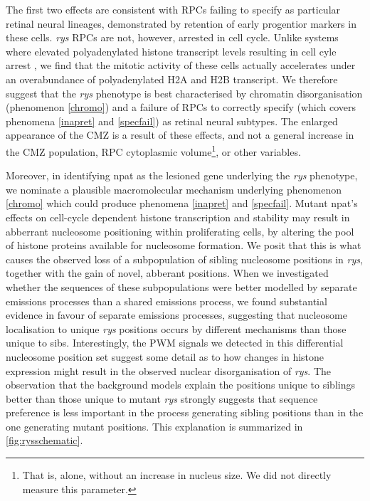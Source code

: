 The first two effects are consistent with RPCs failing to specify as particular retinal neural lineages, demonstrated by retention of early progentior markers in these cells. \textit{rys} RPCs are not, however, arrested in cell cycle. Unlike systems where elevated polyadenylated histone transcript levels resulting in cell cyle arrest \cite{Kari2013}, we find that the mitotic activity of these cells actually accelerates under an overabundance of polyadenylated H2A and H2B transcript. We therefore suggest that the \textit{rys} phenotype is best characterised by chromatin disorganisation (phenomenon \ref{chromo}) and a failure of RPCs to correctly specify (which covers phenomena \ref{inapret} and \ref{specfail}) as retinal neural subtypes. The enlarged appearance of the CMZ is a result of these effects, and not a general increase in the CMZ population, RPC cytoplasmic volume\footnote{That is, alone, without an increase in nucleus size. We did not directly measure this parameter.}, or other variables. 

Moreover, in identifying npat as the lesioned gene underlying the \textit{rys} phenotype, we nominate a plausible macromolecular mechanism underlying phenomenon \ref{chromo} which could produce phenomena \ref{inapret} and \ref{specfail}. Mutant npat's effects on cell-cycle dependent histone transcription and stability may result in abberrant nucleosome positioning within proliferating cells, by altering the pool of histone proteins available for nucleosome formation. We posit that this is what causes the observed loss of a subpopulation of sibling nucleosome positions in \textit{rys}, together with the gain of novel, abberant positions. When we investigated whether the sequences of these subpopulations were better modelled by separate emissions processes than a shared emissions process, we found substantial evidence in favour of separate emissions processes, suggesting that nucleosome localisation to unique \textit{rys} positions occurs by different mechanisms than those unique to sibs. Interestingly, the PWM signals we detected in this differential nucleosome position set suggest some detail as to how changes in histone expression might result in the observed nuclear disorganisation of \textit{rys}. The observation that the background models explain the positions unique to siblings better than those unique to mutant \textit{rys} strongly suggests that sequence preference is less important in the process generating sibling positions than in the one generating mutant positions. This explanation is summarized in \autoref{fig:rysschematic}.

